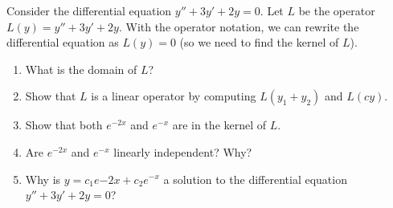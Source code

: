 \begin{problem}
 Consider the differential equation $y''+3y'+2y=0$. Let $L$ be the operator $L(y) = y''+3y'+2y$.  With the operator notation, we can rewrite the differential equation as $L(y)=0$ (so we need to find the kernel of $L$).  
\begin{enumerate}
 \item What is the domain of $L$?
 \item Show that $L$ is a linear operator by computing $L(y_1+y_2)$ and $L(cy)$.
 \item Show that both $e^{-2x}$ and $e^{-x}$ are in the kernel of $L$.
 \item Are $e^{-2x}$ and $e^{-x}$ linearly independent? Why?
 \item Why is $y=c_1e{-2x}+c_2e^{-x}$ a solution to the differential equation $y''+3y'+2y=0$?
\end{enumerate}
\end{problem}



